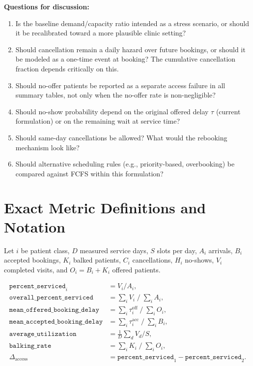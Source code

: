\documentclass[11pt]{article}
\begin{document}
\bigskip
\noindent\textbf{Questions for discussion:}
\begin{enumerate}[leftmargin=1.5em, itemsep=4pt]
\item Is the baseline demand/capacity ratio intended as a stress scenario,
or should it be recalibrated toward a more plausible clinic setting?
\item Should cancellation remain a daily hazard over future bookings, or
should it be modeled as a one-time event at booking? The cumulative
cancellation fraction depends critically on this.
\item Should no-offer patients be reported as a separate access failure
in all summary tables, not only when the no-offer rate is non-negligible?
\item Should no-show probability depend on the original offered delay $\tau$
(current formulation) or on the remaining wait at service time?
\item Should same-day cancellations be allowed? What would the rebooking
mechanism look like?
\item Should alternative scheduling rules (e.g., priority-based,
overbooking) be compared against FCFS within this formulation?
\end{enumerate}

\appendix

\section{Exact Metric Definitions and Notation}
\label{app:defs}

Let $i$ be patient class, $D$ measured service days, $S$ slots per day,
$A_i$ arrivals, $B_i$ accepted bookings, $K_i$ balked patients, $C_i$
cancellations, $H_i$ no-shows, $V_i$ completed visits, and
$O_i = B_i + K_i$ offered patients.

\begin{align*}
\texttt{percent\_serviced}_i &= V_i / A_i, \\
\texttt{overall\_percent\_serviced} &= \textstyle\sum_i V_i \;/\; \textstyle\sum_i A_i, \\
\texttt{mean\_offered\_booking\_delay} &= \textstyle\sum_i \tau^{\text{off}}_i \;/\; \textstyle\sum_i O_i, \\
\texttt{mean\_accepted\_booking\_delay} &= \textstyle\sum_i \tau^{\text{acc}}_i \;/\; \textstyle\sum_i B_i, \\
\texttt{average\_utilization} &= \tfrac{1}{D}\textstyle\sum_d V_d / S, \\
\texttt{balking\_rate} &= \textstyle\sum_i K_i \;/\; \textstyle\sum_i O_i, \\
\Delta_{\text{access}} &= \texttt{percent\_serviced}_1 - \texttt{percent\_serviced}_2.
\end{align*}
\end{document}
